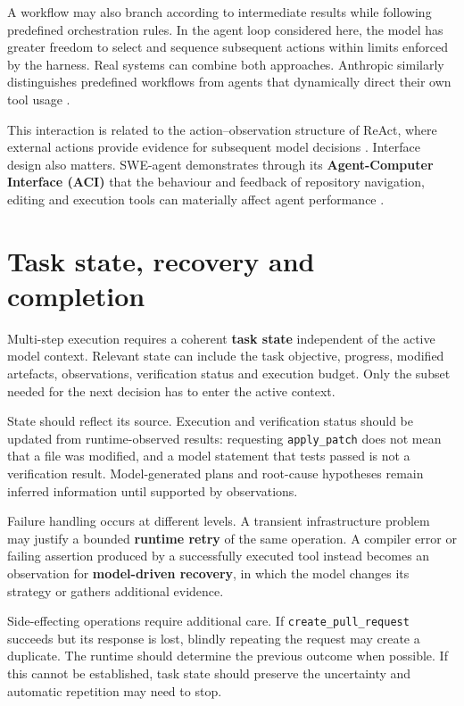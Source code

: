 A workflow may also branch according to intermediate results while following predefined orchestration rules. In the agent loop considered here, the model has greater freedom to select and sequence subsequent actions within limits enforced by the harness. Real systems can combine both approaches. Anthropic similarly distinguishes predefined workflows from agents that dynamically direct their own tool usage \parencite{schluntz2024agents}.

This interaction is related to the action–observation structure of ReAct, where external actions provide evidence for subsequent model decisions \parencite{yao2023react}. Interface design also matters. SWE-agent demonstrates through its \textbf{Agent-Computer Interface (ACI)} that the behaviour and feedback of repository navigation, editing and execution tools can materially affect agent performance \parencite{yang2024sweagent}.

\section{Task state, recovery and completion}
\label{sec:agent-task-state}

Multi-step execution requires a coherent \textbf{task state} independent of the active model context. Relevant state can include the task objective, progress, modified artefacts, observations, verification status and execution budget. Only the subset needed for the next decision has to enter the active context.

State should reflect its source. Execution and verification status should be updated from runtime-observed results: requesting \texttt{apply\_patch} does not mean that a file was modified, and a model statement that tests passed is not a verification result. Model-generated plans and root-cause hypotheses remain inferred information until supported by observations.

Failure handling occurs at different levels. A transient infrastructure problem may justify a bounded \textbf{runtime retry} of the same operation. A compiler error or failing assertion produced by a successfully executed tool instead becomes an observation for \textbf{model-driven recovery}, in which the model changes its strategy or gathers additional evidence.

Side-effecting operations require additional care. If \texttt{create\_pull\_request} succeeds but its response is lost, blindly repeating the request may create a duplicate. The runtime should determine the previous outcome when possible. If this cannot be established, task state should preserve the uncertainty and automatic repetition may need to stop.

